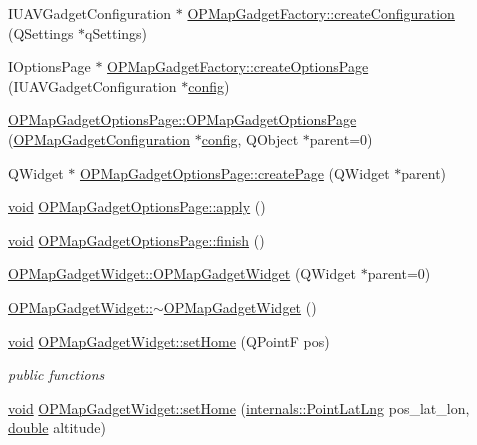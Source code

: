 \begin{DoxyCompactItemize}
\item 
I\-U\-A\-V\-Gadget\-Configuration $\ast$ \hyperlink{group___o_p_map_plugin_ga7f75947f3d08a110f8289998a41f44ee}{O\-P\-Map\-Gadget\-Factory\-::create\-Configuration} (Q\-Settings $\ast$q\-Settings)
\item 
I\-Options\-Page $\ast$ \hyperlink{group___o_p_map_plugin_gadde2c412f864fe77db6ea353a5e7071b}{O\-P\-Map\-Gadget\-Factory\-::create\-Options\-Page} (I\-U\-A\-V\-Gadget\-Configuration $\ast$\hyperlink{deflate_8c_a4473b5227787415097004fd39f55185e}{config})
\item 
\hyperlink{group___o_p_map_plugin_ga23f0a8c69cfb41e42f3304d1b4a4cd34}{O\-P\-Map\-Gadget\-Options\-Page\-::\-O\-P\-Map\-Gadget\-Options\-Page} (\hyperlink{class_o_p_map_gadget_configuration}{O\-P\-Map\-Gadget\-Configuration} $\ast$\hyperlink{deflate_8c_a4473b5227787415097004fd39f55185e}{config}, Q\-Object $\ast$parent=0)
\item 
Q\-Widget $\ast$ \hyperlink{group___o_p_map_plugin_gaec7ef2751680eb7ff0f4f6abdf2fd4c4}{O\-P\-Map\-Gadget\-Options\-Page\-::create\-Page} (Q\-Widget $\ast$parent)
\item 
\hyperlink{group___u_a_v_objects_plugin_ga444cf2ff3f0ecbe028adce838d373f5c}{void} \hyperlink{group___o_p_map_plugin_ga8b2ec9377a2fb5a144b5c5aab349225f}{O\-P\-Map\-Gadget\-Options\-Page\-::apply} ()
\item 
\hyperlink{group___u_a_v_objects_plugin_ga444cf2ff3f0ecbe028adce838d373f5c}{void} \hyperlink{group___o_p_map_plugin_ga7d645e14473ae14e762cc694e85e28a8}{O\-P\-Map\-Gadget\-Options\-Page\-::finish} ()
\item 
\hyperlink{group___o_p_map_plugin_ga7fe62a2d1a8b920f3e44900dee8d9d5a}{O\-P\-Map\-Gadget\-Widget\-::\-O\-P\-Map\-Gadget\-Widget} (Q\-Widget $\ast$parent=0)
\item 
\hyperlink{group___o_p_map_plugin_ga7c7775d0011bd9d0f8ca0219f48bc193}{O\-P\-Map\-Gadget\-Widget\-::$\sim$\-O\-P\-Map\-Gadget\-Widget} ()
\item 
\hyperlink{group___u_a_v_objects_plugin_ga444cf2ff3f0ecbe028adce838d373f5c}{void} \hyperlink{group___o_p_map_plugin_gaea4b659a9476e351373fc6df96026327}{O\-P\-Map\-Gadget\-Widget\-::set\-Home} (Q\-Point\-F pos)
\begin{DoxyCompactList}\small\item\em public functions \end{DoxyCompactList}\item 
\hyperlink{group___u_a_v_objects_plugin_ga444cf2ff3f0ecbe028adce838d373f5c}{void} \hyperlink{group___o_p_map_plugin_ga7eaa4b0e19be1df614f49d7b86393a19}{O\-P\-Map\-Gadget\-Widget\-::set\-Home} (\hyperlink{structinternals_1_1_point_lat_lng}{internals\-::\-Point\-Lat\-Lng} pos\-\_\-lat\-\_\-lon, \hyperlink{_super_l_u_support_8h_a8956b2b9f49bf918deed98379d159ca7}{double} altitude)

\end{DoxyCompactItemize}
